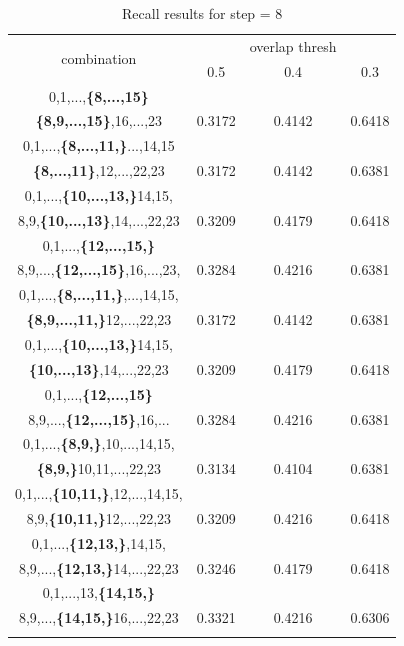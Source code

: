 \documentclass{report}
\begin{document}
\begin{center}
\begin{longtable}{||c||c c c||}

  \hline
  \multirow{2}{5em}{combination} & {} &overlap thresh & {} \\
                                    &  0.5  &  0.4 &  0.3 \\         
  \hline  \hline
  0,1,...,\textbf{\{8,...,15\}}               & {} & {} & {} \\
  \textbf{\{8,9,...,15\}},16,...,23           & 0.3172 & 0.4142 & 0.6418 \\
  \hline     \hline                          


  0,1,...,\textbf{\{8,...,11,\}}...,14,15     & {} & {} & {} \\
  \textbf{\{8,...,11\}},12,...,22,23          & 0.3172 & 0.4142& 0.6381 \\
  \hline
  0,1,...,\textbf{\{10,...,13,\}}14,15,       & {} & {} & {} \\
  8,9,\textbf{\{10,...,13\}},14,...,22,23     & 0.3209 &0.4179   & 0.6418 \\
  \hline
  0,1,...,\textbf{\{12,...,15,\}}             & {} & {} & {} \\
  8,9,...,\textbf{\{12,...,15\}},16,...,23,   & 0.3284 & 0.4216 & 0.6381 \\
  \hline     \hline                          

  0,1,...,\textbf{\{8,...,11,\}},...,14,15,   & {} & {} & {} \\
  \textbf{\{8,9,...,11,\}}12,...,22,23        & 0.3172   & 0.4142& 0.6381 \\
  \hline
  0,1,...,\textbf{\{10,...,13,\}}14,15,       & {} & {} & {} \\
  \textbf{\{10,...,13\}},14,...,22,23         & 0.3209 &0.4179   & 0.6418 \\
  \hline
  0,1,...,\textbf{\{12,...,15\}}              & {} & {} & {} \\
  8,9,...,\textbf{\{12,...,15\}},16,...       & 0.3284 & 0.4216 & 0.6381 \\
  \hline \hline
  
  0,1,...,\textbf{\{8,9,\}},10,...,14,15,     & {} & {} & {} \\
  \textbf{\{8,9,\}}10,11,...,22,23            & 0.3134   & 0.4104 & 0.6381 \\
  \hline
  0,1,...,\textbf{\{10,11,\}},12,...,14,15,   & {} & {} & {} \\
  8,9,\textbf{\{10,11,\}}12,...,22,23         & 0.3209   & 0.4216 & 0.6418 \\
  \hline
  0,1,...,\textbf{\{12,13,\}},14,15,          & {} & {} & {} \\
  8,9,...,\textbf{\{12,13,\}}14,...,22,23     & 0.3246   & 0.4179 & 0.6418 \\
  \hline
  0,1,...,13,\textbf{\{14,15,\}}              & {} & {} & {} \\
  8,9,...,\textbf{\{14,15,\}}16,...,22,23     & 0.3321   & 0.4216 & 0.6306 \\
  \hline \hline
  \caption{Recall results for step = 8}
  \label{table:step8_16}
\end{longtable} 
\end{center}
\end{document}
